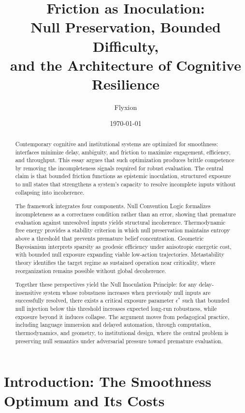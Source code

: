 \documentclass[11pt]{article}
\title{\textbf{Friction as Inoculation:\\[4pt]
Null Preservation, Bounded Difficulty,\\[2pt]
and the Architecture of Cognitive Resilience}}
\author{Flyxion}
\date{\today}
\theoremstyle{remark}
\begin{document}
\maketitle

\begin{abstract}
Contemporary cognitive and institutional systems are optimized for smoothness: interfaces minimize delay, ambiguity, and friction to maximize engagement, efficiency, and throughput. This essay argues that such optimization produces brittle competence by removing the incompleteness signals required for robust evaluation. The central claim is that bounded friction functions as epistemic inoculation, structured exposure to null states that strengthens a system’s capacity to resolve incomplete inputs without collapsing into incoherence.

The framework integrates four components. Null Convention Logic formalizes incompleteness as a correctness condition rather than an error, showing that premature evaluation against unresolved inputs yields structural incoherence. Thermodynamic free energy provides a stability criterion in which null preservation maintains entropy above a threshold that prevents premature belief concentration. Geometric Bayesianism interprets sparsity as geodesic efficiency under anisotropic energetic cost, with bounded null exposure expanding viable low-action trajectories. Metastability theory identifies the target regime as sustained operation near criticality, where reorganization remains possible without global decoherence.

Together these perspectives yield the Null Inoculation Principle: for any delay-insensitive system whose robustness increases when previously null inputs are successfully resolved, there exists a critical exposure parameter $\epsilon^*$ such that bounded null injection below this threshold increases expected long-run robustness, while exposure beyond it induces collapse. The argument moves from pedagogical practice, including language immersion and delayed automation, through computation, thermodynamics, and geometry, to institutional design, where the central problem is preserving null semantics under adversarial pressure toward premature evaluation.
\end{abstract}

\tableofcontents

\newpage


\section{Introduction: The Smoothness Optimum and Its Costs}
\label{sec:intro}
\end{document}
